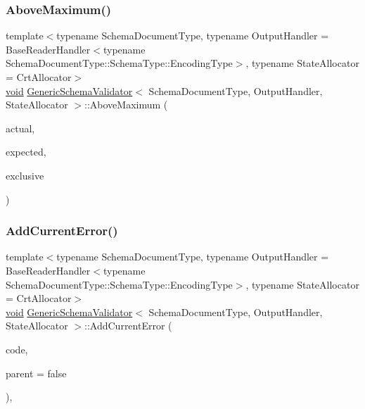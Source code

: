 \mbox{\label{classGenericSchemaValidator_abcf1f5b46bdae8ca20a80858d603483d}} 
\subsubsection{\texorpdfstring{Above\+Maximum()}{AboveMaximum()}\hspace{0.1cm}{\footnotesize\ttfamily [3/3]}}
{\footnotesize\ttfamily template$<$typename Schema\+Document\+Type, typename Output\+Handler = Base\+Reader\+Handler$<$typename Schema\+Document\+Type\+::\+Schema\+Type\+::\+Encoding\+Type$>$, typename State\+Allocator = Crt\+Allocator$>$ \\
\hyperlink{imgui__impl__opengl3__loader_8h_ac668e7cffd9e2e9cfee428b9b2f34fa7}{void} \hyperlink{classGenericSchemaValidator}{Generic\+Schema\+Validator}$<$ Schema\+Document\+Type, Output\+Handler, State\+Allocator $>$\+::Above\+Maximum (\begin{DoxyParamCaption}\item[{double}]{actual,  }\item[{const \hyperlink{classGenericSchemaValidator_a3c004e35c7eb9fa5a28c0ccfb8ac62dc}{S\+Value} \&}]{expected,  }\item[{bool}]{exclusive }\end{DoxyParamCaption})\hspace{0.3cm}{\ttfamily [inline]}}

\mbox{\label{classGenericSchemaValidator_a9553b3f47b319674386ecafa513f0489}} 
\subsubsection{\texorpdfstring{Add\+Current\+Error()}{AddCurrentError()}}
{\footnotesize\ttfamily template$<$typename Schema\+Document\+Type, typename Output\+Handler = Base\+Reader\+Handler$<$typename Schema\+Document\+Type\+::\+Schema\+Type\+::\+Encoding\+Type$>$, typename State\+Allocator = Crt\+Allocator$>$ \\
\hyperlink{imgui__impl__opengl3__loader_8h_ac668e7cffd9e2e9cfee428b9b2f34fa7}{void} \hyperlink{classGenericSchemaValidator}{Generic\+Schema\+Validator}$<$ Schema\+Document\+Type, Output\+Handler, State\+Allocator $>$\+::Add\+Current\+Error (\begin{DoxyParamCaption}\item[{const \hyperlink{group__RAPIDJSON__ERRORS_ga2e1f88f94a5d9a6817a5de0ed2f0105a}{Validate\+Error\+Code}}]{code,  }\item[{bool}]{parent = {\ttfamily false} }\end{DoxyParamCaption})\hspace{0.3cm}{\ttfamily [inline]}, {\ttfamily [private]}}

